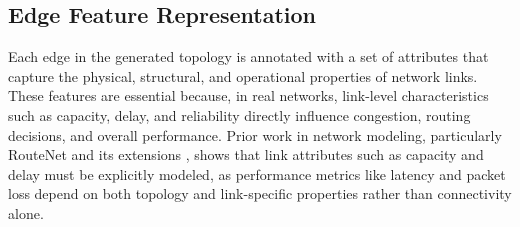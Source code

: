 \documentclass[12pt]{article}
\begin{document}
\subsection{Edge Feature Representation}
Each edge in the generated topology is annotated with a set of attributes that capture the physical, structural, and operational properties of network links. These features are essential because, in real networks, link-level characteristics such as capacity, delay, and reliability directly influence congestion, routing decisions, and overall performance. Prior work in network modeling, particularly RouteNet and its extensions \cite{routeNet}, shows that link attributes such as capacity and delay must be explicitly modeled, as performance metrics like latency and packet loss depend on both topology and link-specific properties rather than connectivity alone.
\end{document}
